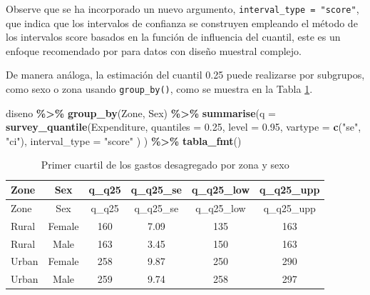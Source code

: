 \documentclass[
  spanish,
  12pt,
]{book}
\newenvironment{Shaded}{\begin{snugshade}}{\end{snugshade}}
\newcommand{\AttributeTok}[1]{\textcolor[rgb]{0.13,0.29,0.53}{#1}}
\newcommand{\FloatTok}[1]{\textcolor[rgb]{0.00,0.00,0.81}{#1}}
\newcommand{\FunctionTok}[1]{\textcolor[rgb]{0.13,0.29,0.53}{\textbf{#1}}}
\newcommand{\NormalTok}[1]{#1}
\newcommand{\SpecialCharTok}[1]{\textcolor[rgb]{0.81,0.36,0.00}{\textbf{#1}}}
\newcommand{\StringTok}[1]{\textcolor[rgb]{0.31,0.60,0.02}{#1}}
\begin{document}
Observe que se ha incorporado un nuevo argumento, \texttt{interval\_type\ =\ "score"}, que indica que los intervalos de confianza se construyen empleando el método de los intervalos score basados en la función de influencia del cuantil, este es un enfoque recomendado por \citet{Lumley2010} para datos con diseño muestral complejo.

De manera análoga, la estimación del cuantil 0.25 puede realizarse por subgrupos, como sexo o zona usando \texttt{group\_by()}, como se muestra en la Tabla \ref{tab:tab-cuantil-gasto-zona-sexo}.

\begin{Shaded}
\begin{Highlighting}[]
\NormalTok{diseno }\SpecialCharTok{\%\textgreater{}\%} 
  \FunctionTok{group\_by}\NormalTok{(Zone, Sex) }\SpecialCharTok{\%\textgreater{}\%}
  \FunctionTok{summarise}\NormalTok{(}\AttributeTok{q =} \FunctionTok{survey\_quantile}\NormalTok{(Expenditure,}
                                \AttributeTok{quantiles =} \FloatTok{0.25}\NormalTok{,}
                                \AttributeTok{level =} \FloatTok{0.95}\NormalTok{,}
                                \AttributeTok{vartype =}  \FunctionTok{c}\NormalTok{(}\StringTok{"se"}\NormalTok{, }\StringTok{"ci"}\NormalTok{),}
                                \AttributeTok{interval\_type =} \StringTok{"score"}
\NormalTok{                                )}
\NormalTok{            ) }\SpecialCharTok{\%\textgreater{}\%}
  \FunctionTok{tabla\_fmt}\NormalTok{()}
\end{Highlighting}
\end{Shaded}

\begin{longtable}[]{@{}lccccc@{}}
\caption{\label{tab:tab-cuantil-gasto-zona-sexo}Primer cuartil de los gastos desagregado por zona y sexo}\tabularnewline
\toprule\noalign{}
Zone & Sex & q\_q25 & q\_q25\_se & q\_q25\_low & q\_q25\_upp \\
\midrule\noalign{}
\endfirsthead
\toprule\noalign{}
Zone & Sex & q\_q25 & q\_q25\_se & q\_q25\_low & q\_q25\_upp \\
\midrule\noalign{}
\endhead
\bottomrule\noalign{}
\endlastfoot
Rural & Female & 160 & 7.09 & 135 & 163 \\
Rural & Male & 163 & 3.45 & 150 & 163 \\
Urban & Female & 258 & 9.87 & 250 & 290 \\
Urban & Male & 259 & 9.74 & 258 & 297 \\
\end{longtable}
\end{document}
